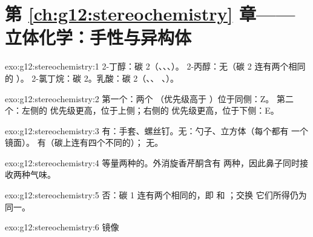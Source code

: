 \section*{第 \ref{ch:g12:stereochemistry} 章——立体化学：手性与异构体}

\begin{solution}{exo:g12:stereochemistry:1}
2-丁醇：碳 2（、、、）。
2-丙醇：无（碳 2 连有两个相同的 ）。
2-氯丁烷：碳 2。乳酸：碳 2（、、
、）。
\end{solution}

\begin{solution}{exo:g12:stereochemistry:2}
第一个：两个 （优先级高于 ）位于同侧：Z。
第二个：左侧的  优先级更高，位于上侧；右侧的
 优先级更高，位于下侧：E。
\end{solution}

\begin{solution}{exo:g12:stereochemistry:3}
有：手套、螺丝钉。无：勺子、立方体（每个都有
一个镜面）。 有（碳上连有四个不同的）；
 无。
\end{solution}

\begin{solution}{exo:g12:stereochemistry:4}
等量两种的。外消旋香芹酮含有
两种，因此鼻子同时接收两种气味。
\end{solution}

\begin{solution}{exo:g12:stereochemistry:5}
否：碳 1 连有两个相同的，即  和 ；交换
它们所得仍为同一。
\end{solution}

\begin{solution}{exo:g12:stereochemistry:6}
 \quad 镜像
\quad {}
\end{solution}

